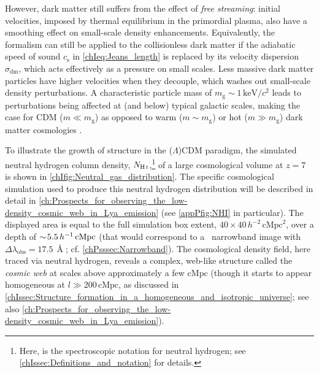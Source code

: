 However, dark matter still suffers from the effect of \textit{free streaming}: initial velocities, imposed by thermal equilibrium in the primordial plasma, also have a smoothing effect on small-scale density enhancements. Equivalently, the \citeauthor{1902RSPTA.199....1J} formalism can still be applied to the collisionless dark matter if the adiabatic speed of sound $c_\text{s}$ in \cref{chIeq:Jeans_length} is replaced by its velocity dispersion $\sigma_\text{dm}$, which acts effectively as a pressure on small scales. Less massive dark matter particles have higher velocities when they decouple, which washes out small-scale density perturbations. A characteristic particle mass of $m_\text{g} \sim 1 \, \mathrm{keV}/c^2$ leads to perturbations being affected at (and below) typical galactic scales, making the case for CDM ($m \ll m_\text{g}$) as opposed to warm ($m \sim m_\text{g}$) or hot ($m \gg m_\text{g}$) dark matter cosmologies \citep[e.g.][]{1982ApJ...263L...1P}.

To illustrate the growth of structure in the ($\Lambda$)CDM paradigm, the simulated neutral hydrogen column density, $N_\text{\ion{H}{I}}$,\footnote{Here,  is the spectroscopic notation for neutral hydrogen; see \cref{chIssec:Definitions_and_notation} for details.} of a large cosmological volume at $z = 7$ is shown in \cref{chIfig:Neutral_gas_distribution}. The specific cosmological simulation used to produce this neutral hydrogen distribution will be described in detail in \cref{ch:Prospects_for_observing_the_low-density_cosmic_web_in_Lya_emission} (see \cref{appPfig:NHI} in particular). The displayed area is equal to the full simulation box extent, $40 \times 40 \, h^{-2} \, \mathrm{cMpc}^2$, over a depth of $\sim \! 5.5 \, h^{-1} \, \mathrm{cMpc}$ (that would correspond to a \lymana\ narrowband image with $\Delta \lambda_\text{obs} = 17.5 \, \Angstrom$; cf. \cref{chPsssec:Narrowband}). The cosmological density field, here traced via neutral hydrogen, reveals a complex, web-like structure called the \textit{cosmic web} at scales above approximately a few $\mathrm{cMpc}$ (though it starts to appear homogeneous at $l \gg 200 \, \mathrm{cMpc}$, as discussed in \cref{chIssec:Structure_formation_in_a_homogeneous_and_isotropic_universe}; see also \cref{ch:Prospects_for_observing_the_low-density_cosmic_web_in_Lya_emission}).

